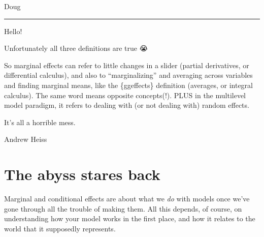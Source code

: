 \documentclass[
]{article}
\begin{document}
Doug

\begin{center}\rule{0.5\linewidth}{0.5pt}\end{center}

Hello!

Unfortunately all three definitions are true 😭

So marginal effects can refer to little changes in a slider (partial
derivatives, or differential calculus), and also to ``marginalizing''
and averaging across variables and finding marginal means, like the
\{ggeffects\} definition (averages, or integral calculus). The same word
means opposite concepts(!). PLUS in the multilevel model paradigm, it
refers to dealing with (or not dealing with) random effects.

It's all a horrible mess.

Andrew Heiss

\hypertarget{the-abyss-stares-back}{%
\section{The abyss stares back}\label{the-abyss-stares-back}}

Marginal and conditional effects are about what we \emph{do} with models
once we've gone through all the trouble of making them. All this
depends, of course, on understanding how your model works in the first
place, and how it relates to the world that it supposedly represents.
\end{document}
